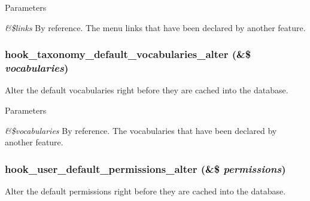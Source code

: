 \begin{DoxyParams}{Parameters}
\item[{\em \&\$links}]By reference. The menu links that have been declared by another feature. \end{DoxyParams}
\hypertarget{group__features__component__alter__hooks_ga5e43b3c1b03d748e9da468c83d3a1efc}{
\subsubsection[{hook\_\-taxonomy\_\-default\_\-vocabularies\_\-alter}]{\setlength{\rightskip}{0pt plus 5cm}hook\_\-taxonomy\_\-default\_\-vocabularies\_\-alter (\&\$ {\em vocabularies})}}
\label{group__features__component__alter__hooks_ga5e43b3c1b03d748e9da468c83d3a1efc}
Alter the default vocabularies right before they are cached into the database.


\begin{DoxyParams}{Parameters}
\item[{\em \&\$vocabularies}]By reference. The vocabularies that have been declared by another feature. \end{DoxyParams}
\hypertarget{group__features__component__alter__hooks_ga905999267231b7418a89a4856dbbfc00}{
\subsubsection[{hook\_\-user\_\-default\_\-permissions\_\-alter}]{\setlength{\rightskip}{0pt plus 5cm}hook\_\-user\_\-default\_\-permissions\_\-alter (\&\$ {\em permissions})}}
\label{group__features__component__alter__hooks_ga905999267231b7418a89a4856dbbfc00}
Alter the default permissions right before they are cached into the database.


